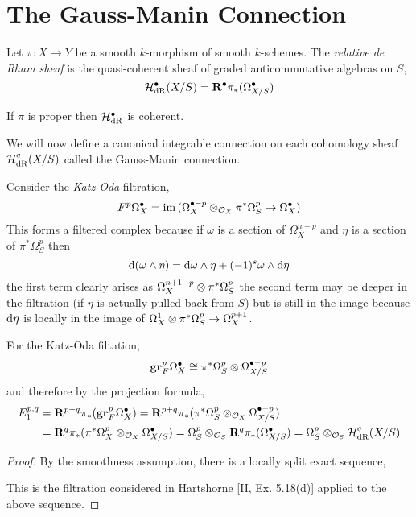\documentclass[12pt]{article}
\begin{document}
\section{The Gauss-Manin Connection}

\begin{defn}
Let $\pi : X \to Y$ be a smooth $k$-morphism of smooth $k$-schemes. The \textit{relative de Rham sheaf} is the quasi-coherent sheaf of graded anticommutative algebras on $S$,
\[ \mathcal{H}_{\mathrm{dR}}^\bullet(X/S) = \mathbf{R}^\bullet \pi_* (\Omega^\bullet_{X/S}) \]
\end{defn}

\begin{rmk}
If $\pi$ is proper then $\mathcal{H}_{\mathrm{dR}}^\bullet$ is coherent.
\end{rmk}

We will now define a canonical integrable connection on each cohomology sheaf $\mathcal{H}_{\mathrm{dR}}^q(X/S)$ called the Gauss-Manin connection.

\begin{defn}
Consider the \textit{Katz-Oda} filtration,
\[ F^p \Omega^\bullet_{X} = \operatorname{\mathrm{im}}{(\Omega_X^{\bullet -p} \otimes_{\mathcal{O}_{X}} \pi^* \Omega_S^p \to \Omega_X^\bullet)} \]
This forms a filtered complex because if $\omega$ is a section of $\Omega_X^{n-p}$ and $\eta$ is a section of $\pi^* \Omega_S^p$ then
\[ \mathrm{d}{(\omega \wedge \eta)} = \mathrm{d}{\omega} \wedge \eta + (-1)^s \omega \wedge \mathrm{d}{\eta} \]
the first term clearly arises as $\Omega^{n+1 - p}_X \otimes \pi^* \Omega_S^p$ the second term may be deeper in the filtration (if $\eta$ is actually pulled back from $S$) but is still in the image because $\mathrm{d}{\eta}$ is locally in the image of $\Omega_X^1 \otimes \pi^* \Omega_S^p \to \Omega_X^{p+1}$.
\end{defn}


\begin{lemma}
For the Katz-Oda filtation,
\[ \mathbf{gr}^p_F \Omega^\bullet_X \cong \pi^{*}\Omega_S^p \otimes \Omega_{X/S}^{\bullet - p}  \]
and therefore by the projection formula,
\begin{align*}
E_1^{p,q} & = \mathbf{R}^{p+q} \pi_*(\mathbf{gr}^p_F \Omega_X^\bullet) = \mathbf{R}^{p+q} \pi_* (\pi^* \Omega^p_S \otimes_{\mathcal{O}_{X}} \Omega^{\bullet - p}_{X/S}) 
\\
& = \mathbf{R}^q \pi_* (\pi^* \Omega^p_X \otimes_{\mathcal{O}_{X}} \Omega_{X/S}^\bullet) = \Omega^p_{S} \otimes_{\mathcal{O}_{S}} \mathbf{R}^q \pi_* (\Omega^\bullet_{X/S}) = \Omega^p_S \otimes_{\mathcal{O}_{S}} \mathcal{H}_{\mathrm{dR}}^q(X/S) 
\end{align*}
\end{lemma}

\begin{proof}
By the smoothness assumption, there is a locally split exact sequence,
\begin{center}
\end{center}
This is the filtration considered in Hartshorne [II, Ex. 5.18(d)] applied to the above sequence. 
\end{proof}
\end{document}

